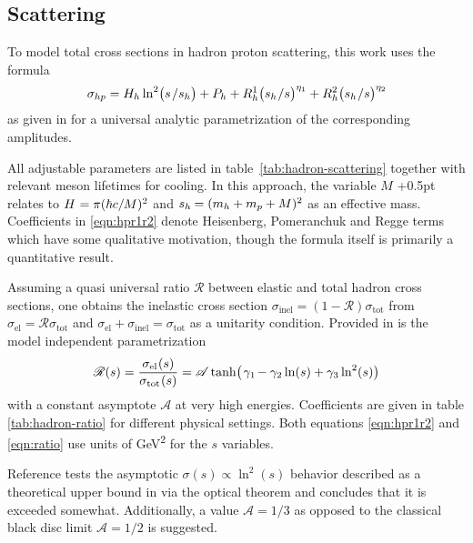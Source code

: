 \subsection*{Scattering}

To model total cross sections in hadron proton scattering, this work uses the formula
\begin{equation}
	\sigma_{hp} = H_h \ln^2 \bigl( s \kern+1.0pt / s_h \bigr) + P_h +
	R_h^1 \bigl( s_h \kern+0.5pt / s \bigr)^{\eta_1} + R_h^2 \bigl( s_h \kern+0.5pt / s \bigr)^{\eta_2}
	\label{eqn:hpr1r2}
\end{equation}
as given in \cite{Belousov_2016} for a universal analytic parametrization of the corresponding amplitudes.

All adjustable parameters are listed in table~\ref{tab:hadron-scattering} together with relevant meson lifetimes for
cooling. In this approach, the variable $M$ \kern+0.5pt relates to $H \kern+0.5pt = \pi (\hbar c / M)^2$ and
$s_h \kern-0.5pt = (m_h + m_p + M)^2$ as an effective mass. Coefficients in \eqref{eqn:hpr1r2} denote Heisenberg,
Pomeranchuk and Regge terms which have some qualitative motivation, though the formula itself is primarily a quantitative
result.



Assuming a quasi universal ratio $\mathscr{R}$ between elastic and total hadron cross sections, one obtains the inelastic
cross section $\sigma_\text{inel} = (1 - \mathscr{R}) \sigma_\text{tot}$ from $\sigma_\text{el} = \mathscr{R} \sigma_\text{tot}$
and $\sigma_\text{el} + \sigma_\text{inel} = \sigma_\text{tot}$ as a unitarity condition. Provided in \cite{Fagundes_2012} is
the model independent parametrization
\begin{equation}
	\mathscr{R}(s) = \frac{\sigma_{\text{el}\kern+0.5pt} (s)}{\sigma_{\text{tot}\kern+0.5pt} (s)} =
	\mathscr{A} \tanh \bigl( \kern+1.0pt \gamma_1 \kern-1.0pt - \gamma_2 \ln (s) + \gamma_3 \ln^2 (s) \bigr)
	\label{eqn:ratio}
\end{equation}
with a constant asymptote $\mathscr{A}$ at very high energies. Coefficients are given in table \ref{tab:hadron-ratio} for different
physical settings. Both equations \eqref{eqn:hpr1r2} and \eqref{eqn:ratio} use units of \unit{\giga\electronvolt\squared} for the $s$ 
variables.



Reference \cite{Fagundes_2013} tests the asymptotic $\sigma(s) \propto \ln^2(s)$ behavior described as a
theoretical upper bound in \cite{Froissart_1961} via the optical theorem and concludes that it is exceeded somewhat. Additionally,
a value $\mathscr{A} = 1/3$ as opposed to the classical black disc limit $\mathscr{A} = 1/2$ is suggested.



